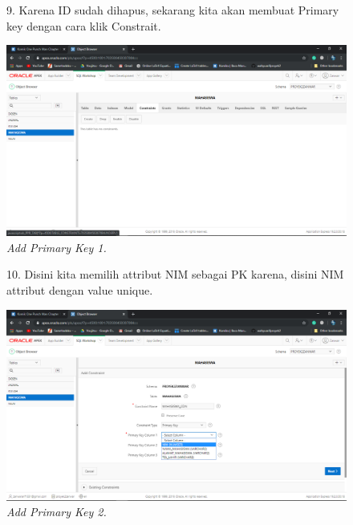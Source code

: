 \begin{enumerate}
    \begin{figure}[!htbp]
    \item[9.] Karena ID sudah dihapus, sekarang kita akan membuat Primary key dengan cara klik Constrait.
    \begin{center}
    \includegraphics[scale=0.3]{figures/Screenshot(125).png}
    \caption{\textit{Add Primary Key 1.}}
    \end{center}   
    \end{figure}
    
    \begin{figure}[!htbp]
    \item[10.] Disini kita memilih attribut NIM sebagai PK karena, disini NIM attribut dengan value unique.
    \begin{center}
    \includegraphics[scale=0.3]{figures/Screenshot(127).png}
    \caption{\textit{Add Primary Key 2.}}
    \end{center}   
    \end{figure}
    

\end{enumerate}
